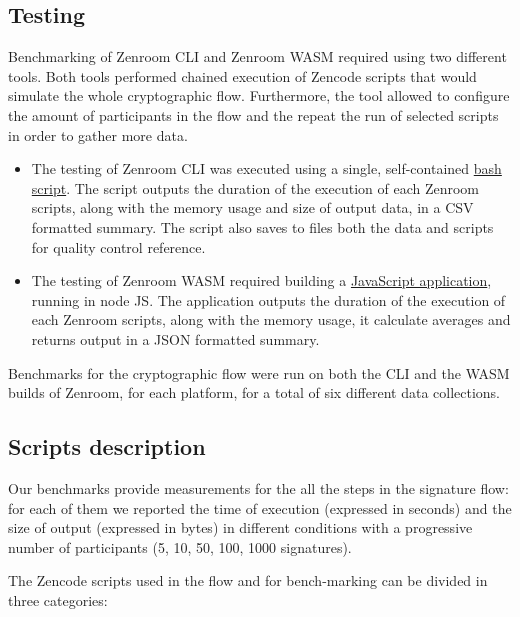\documentclass[twocolumn]{article}
\begin{document}
\subsection*{Testing}
Benchmarking of Zenroom CLI and Zenroom WASM required using two different tools. Both tools performed chained execution of Zencode scripts that would simulate the whole cryptographic flow. Furthermore, the tool allowed to configure the amount of participants in the flow and the repeat the run of selected scripts in order to gather more data.  

\begin{itemize}
\item The testing of Zenroom CLI was executed using a single, self-contained \href{https://github.com/dyne/Zenroom/blob/master/test/zencode_reflow/run-recursive.sh}{bash script}. The script outputs the duration of the execution of each Zenroom scripts, along with the memory usage and size of output data, in a CSV formatted summary. The script also saves to files both the data and scripts for quality control reference.

\item The testing of Zenroom WASM required building a \href{https://github.com/dyne/Reflow-Zencode-WASM-benchmark}{JavaScript application}, running in node JS. The application outputs the duration of the execution of each Zenroom scripts, along with the memory usage, it calculate averages and returns output in a JSON formatted summary.
\end{itemize}

Benchmarks for the cryptographic flow were run on both the CLI and the WASM builds of Zenroom, for each platform, for a total of six different data collections. 

\subsection*{Scripts description}

Our benchmarks provide measurements for the all the steps in the signature flow: for each of them we reported the time of execution (expressed in seconds) and the size of output (expressed in bytes) in different conditions with a progressive number of participants (5, 10, 50, 100, 1000 signatures).

The Zencode scripts used in the flow and for bench-marking can be divided in three categories: 
\end{document}
